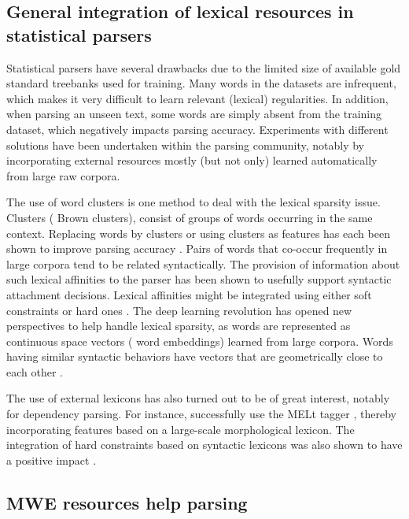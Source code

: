 \documentclass[output=paper]{LSP/langsci}
\begin{document}
\subsection{General integration of lexical resources in statistical parsers}
\label{ssec:lexres-parse}

Statistical parsers have several drawbacks due to the limited size of available gold standard treebanks used for training. Many words in the datasets are  infrequent, which makes it very difficult to learn relevant (lexical) regularities. In addition, when parsing an unseen text, some words are simply absent from  the training dataset, which negatively impacts parsing accuracy. Experiments with  different solutions have been undertaken within the parsing community, notably by incorporating external resources mostly (but not only) learned automatically from large raw corpora.

The use of word clusters is one method to deal with the lexical sparsity issue. Clusters (\eg{} Brown clusters), consist of groups of words occurring in the same  context. 
Replacing words by clusters or using clusters as features has each been shown to improve parsing accuracy  \citep{koo-carreras-collins:2008:aclmain,candito-seddah:2010:spmrl}.
Pairs of words that co-occur frequently in large corpora tend to be related syntactically. 
The provision of information about such lexical affinities to the parser has been shown to usefully support  syntactic attachment decisions. 
Lexical affinities might be integrated using either soft constraints \citep{bansal:11,mirroshandel:12} or hard ones \citep{mirroshandel:2016}. 
The deep learning revolution has opened new perspectives to help handle lexical sparsity, as words are represented as continuous space vectors (\ie{} word embeddings) learned from large corpora. Words having similar syntactic behaviors have vectors that are geometrically close to each other \citep{durrett:15,dyer:15}.

The use of external lexicons has also turned out to be of great interest, notably for dependency parsing. For instance, \citet{candito:2010} successfully use the MELt tagger \citep{denis:2012}, thereby incorporating features based on a large-scale morphological lexicon. The integration of hard constraints based on syntactic lexicons was also shown to have a positive impact \citep{mirroshandel:2013}. 


\subsection{MWE resources help parsing}
\label{ssec:mwe-help-parse}
\end{document}
